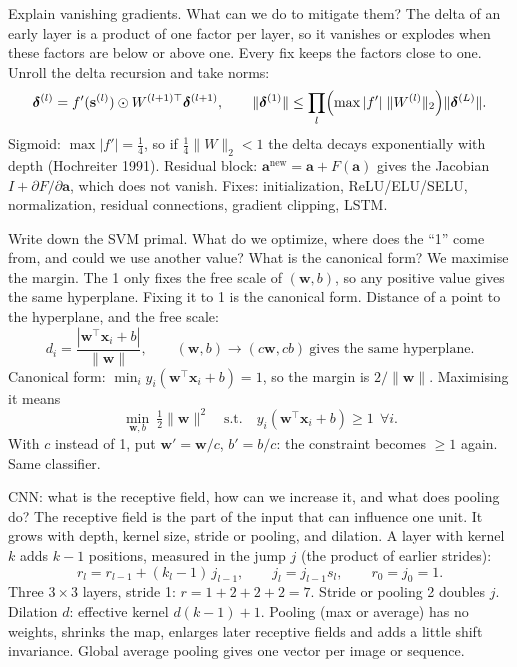 \begin{qabox}[Hochreiter]{\asked Explain vanishing gradients. What can we do to mitigate them?}
\ans The delta of an early layer is a product of one factor per layer, so it vanishes or explodes when these factors
are below or above one. Every fix keeps the factors close to one.
\formula Unroll the delta recursion and take norms:
\[ \boldsymbol\delta^{(l)}=f'(\mathbf{s}^{(l)})\odot W^{(l+1)\top}\boldsymbol\delta^{(l+1)},\qquad
\|\boldsymbol\delta^{(1)}\|\le\prod_{l}\Bigl(\max|f'|\;\|W^{(l)}\|_2\Bigr)\|\boldsymbol\delta^{(L)}\| . \]
Sigmoid: $\max|f'|=\tfrac14$, so if $\tfrac14\|W\|_2<1$ the delta decays exponentially with depth (Hochreiter 1991).
Residual block: $\mathbf{a}^{\text{new}}=\mathbf{a}+F(\mathbf{a})$ gives the Jacobian $I+\partial F/\partial\mathbf{a}$, which does not vanish.
Fixes: initialization, ReLU/ELU/SELU, normalization, residual connections, gradient clipping, LSTM.
\end{qabox}

\begin{qabox}[Hochreiter]{\asked Write down the SVM primal. What do we optimize, where does the ``1'' come from, and could we use another value? What is the canonical form?}
\ans We maximise the margin. The 1 only fixes the free scale of $(\mathbf{w},b)$, so any positive value gives the same
hyperplane. Fixing it to 1 is the canonical form.
\formula Distance of a point to the hyperplane, and the free scale:
\[ d_i=\frac{|\mathbf{w}^\top\mathbf{x}_i+b|}{\|\mathbf{w}\|},\qquad (\mathbf{w},b)\to(c\mathbf{w},cb)\ \text{gives the same hyperplane.} \]
Canonical form: $\min_i y_i(\mathbf{w}^\top\mathbf{x}_i+b)=1$, so the margin is $2/\|\mathbf{w}\|$. Maximising it means
\[ \min_{\mathbf{w},b}\ \tfrac12\|\mathbf{w}\|^2\quad\text{s.t.}\quad y_i(\mathbf{w}^\top\mathbf{x}_i+b)\ge1\ \ \forall i . \]
With $c$ instead of 1, put $\mathbf{w}'=\mathbf{w}/c$, $b'=b/c$: the constraint becomes $\ge1$ again. Same classifier.
\end{qabox}

\begin{qabox}[Schlüter]{\asked CNN: what is the receptive field, how can we increase it, and what does pooling do?}
\ans The receptive field is the part of the input that can influence one unit. It grows with depth, kernel size,
stride or pooling, and dilation.
\formula A layer with kernel $k$ adds $k-1$ positions, measured in the jump $j$ (the product of earlier strides):
\[ r_l=r_{l-1}+(k_l-1)\,j_{l-1},\qquad j_l=j_{l-1}s_l,\qquad r_0=j_0=1 . \]
Three $3\times3$ layers, stride 1: $r=1+2+2+2=7$. Stride or pooling 2 doubles $j$. Dilation $d$: effective kernel
$d(k-1)+1$. Pooling (max or average) has no weights, shrinks the map, enlarges later receptive fields and adds a
little shift invariance. Global average pooling gives one vector per image or sequence.
\end{qabox}
